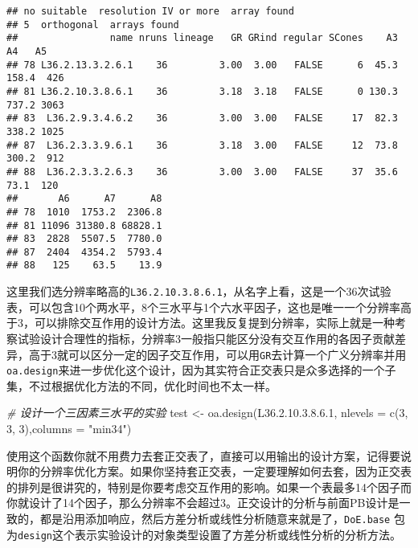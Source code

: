 \documentclass[]{tufte-book}
\newenvironment{Shaded}{}{}
\newcommand{\AttributeTok}[1]{\textcolor[rgb]{0.49,0.56,0.16}{#1}}
\newcommand{\CommentTok}[1]{\textcolor[rgb]{0.38,0.63,0.69}{\textit{#1}}}
\newcommand{\DecValTok}[1]{\textcolor[rgb]{0.25,0.63,0.44}{#1}}
\newcommand{\FloatTok}[1]{\textcolor[rgb]{0.25,0.63,0.44}{#1}}
\newcommand{\FunctionTok}[1]{\textcolor[rgb]{0.02,0.16,0.49}{#1}}
\newcommand{\NormalTok}[1]{#1}
\newcommand{\OtherTok}[1]{\textcolor[rgb]{0.00,0.44,0.13}{#1}}
\newcommand{\StringTok}[1]{\textcolor[rgb]{0.25,0.44,0.63}{#1}}
\begin{document}
\begin{verbatim}
## no suitable  resolution IV or more  array found
## 5  orthogonal  arrays found
##                name nruns lineage   GR GRind regular SCones    A3    A4   A5
## 78 L36.2.13.3.2.6.1    36         3.00  3.00   FALSE      6  45.3 158.4  426
## 81 L36.2.10.3.8.6.1    36         3.18  3.18   FALSE      0 130.3 737.2 3063
## 83  L36.2.9.3.4.6.2    36         3.00  3.00   FALSE     17  82.3 338.2 1025
## 87  L36.2.3.3.9.6.1    36         3.18  3.00   FALSE     12  73.8 300.2  912
## 88  L36.2.3.3.2.6.3    36         3.00  3.00   FALSE     37  35.6  73.1  120
##       A6      A7      A8
## 78  1010  1753.2  2306.8
## 81 11096 31380.8 68828.1
## 83  2828  5507.5  7780.0
## 87  2404  4354.2  5793.4
## 88   125    63.5    13.9
\end{verbatim}

这里我们选分辨率略高的\texttt{L36.2.10.3.8.6.1}，从名字上看，这是一个36次试验表，可以包含10个两水平，8个三水平与1个六水平因子，这也是唯一一个分辨率高于3，可以排除交互作用的设计方法。这里我反复提到分辨率，实际上就是一种考察试验设计合理性的指标，分辨率3一般指只能区分没有交互作用的各因子贡献差异，高于3就可以区分一定的因子交互作用，可以用\texttt{GR}去计算一个广义分辨率并用\texttt{oa.design}来进一步优化这个设计，因为其实符合正交表只是众多选择的一个子集，不过根据优化方法的不同，优化时间也不太一样。

\begin{Shaded}
\begin{Highlighting}[]
\CommentTok{\# 设计一个三因素三水平的实验}
\NormalTok{test }\OtherTok{\textless{}{-}} \FunctionTok{oa.design}\NormalTok{(L36.}\DecValTok{2}\NormalTok{.}\DecValTok{10}\NormalTok{.}\DecValTok{3}\NormalTok{.}\DecValTok{8}\NormalTok{.}\FloatTok{6.1}\NormalTok{, }\AttributeTok{nlevels =} \FunctionTok{c}\NormalTok{(}\DecValTok{3}\NormalTok{, }\DecValTok{3}\NormalTok{, }\DecValTok{3}\NormalTok{),}\AttributeTok{columns =} \StringTok{"min34"}\NormalTok{)}
\end{Highlighting}
\end{Shaded}

使用这个函数你就不用费力去套正交表了，直接可以用输出的设计方案，记得要说明你的分辨率优化方案。如果你坚持套正交表，一定要理解如何去套，因为正交表的排列是很讲究的，特别是你要考虑交互作用的影响。如果一个表最多14个因子而你就设计了14个因子，那么分辨率不会超过3。正交设计的分析与前面PB设计是一致的，都是沿用添加响应，然后方差分析或线性分析随意来就是了，\texttt{DoE.base} 包为\texttt{design}这个表示实验设计的对象类型设置了方差分析或线性分析的分析方法。
\end{document}
